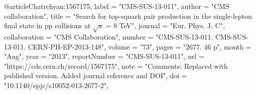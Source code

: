 @article{Chatrchyan:1567175,
      label          = "CMS-SUS-13-011",
      author        = "{CMS collaboration}",
      title         = "{Search for top-squark pair production in the
                       single-lepton final state in pp collisions at $\sqrt{s}$ =
                       8 TeV}",
      journal       = "Eur. Phys. J. C",
      collaboration = "CMS Collaboration",
      number        = "CMS-SUS-13-011. CMS-SUS-13-011. CERN-PH-EP-2013-148",
      volume        = "73",
      pages         = "2677. 46 p",
      month         = "Aug",
      year          = "2013",
      reportNumber  = "CMS-SUS-13-011",
      url           = "https://cds.cern.ch/record/1567175",
      note          = "Comments: Replaced with published version. Added journal
                       reference and DOI",
      doi           = "10.1140/epjc/s10052-013-2677-2",
}

